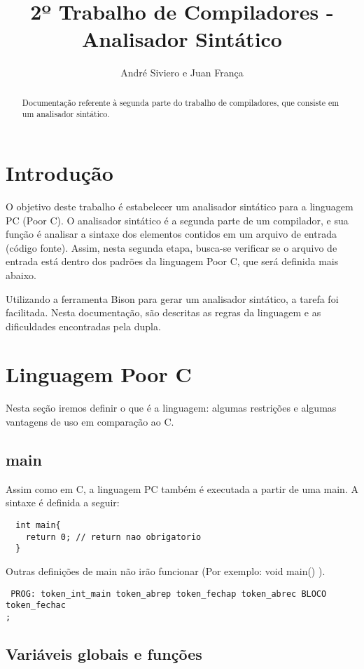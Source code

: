 \documentclass[a4paper,10pt]{article}
\title{2º Trabalho de Compiladores - Analisador Sintático}
\author{André Siviero e Juan França}
\begin{document}
\maketitle

\begin{abstract}
Documentação referente à segunda parte do trabalho de compiladores, que consiste em um analisador sintático.
\end{abstract}

\section{Introdução}
O objetivo deste trabalho é estabelecer um analisador sintático para a linguagem PC (Poor C). O analisador sintático é a segunda parte de um compilador,
e sua função é analisar a sintaxe dos elementos contidos em um arquivo de entrada (código fonte). Assim, nesta segunda etapa, busca-se verificar se o arquivo de entrada
está dentro dos padrões da linguagem Poor C, que será definida mais abaixo.

Utilizando a ferramenta Bison para gerar um analisador sintático, a tarefa foi facilitada. Nesta documentação, são descritas as regras da linguagem e as dificuldades encontradas pela dupla.
\section{Linguagem Poor C}

Nesta seção iremos definir o que é a linguagem: algumas restrições e algumas vantagens de uso em comparação ao C.

\subsection{main}

Assim como em C, a linguagem PC também é executada a partir de uma main. A sintaxe é definida a seguir:

\begin{verbatim}
  int main{
    return 0; // return nao obrigatorio
  }
\end{verbatim}

Outras definições de main não irão funcionar (Por exemplo: void main() ).

\begin{verbatim}
 PROG: token_int_main token_abrep token_fechap token_abrec BLOCO token_fechac
;
\end{verbatim}

\subsection{Variáveis globais e funções}
\end{document}
